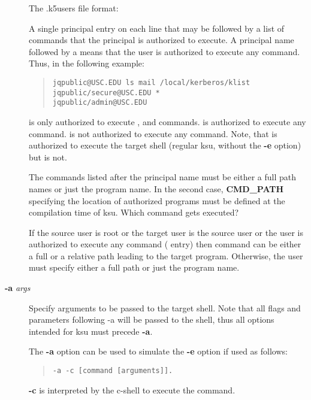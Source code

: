 \documentclass[letterpaper,10pt,english]{sphinxmanual}
\begin{document}
\begin{description}
The .k5users file format:

A single principal entry on each line that may be followed by a
list of commands that the principal is authorized to execute.  A
principal name followed by a \code{*} means that the user is
authorized to execute any command.  Thus, in the following
example:
\begin{quote}

\begin{Verbatim}[commandchars=\\\{\}]
jqpublic@USC.EDU ls mail /local/kerberos/klist
jqpublic/secure@USC.EDU *
jqpublic/admin@USC.EDU
\end{Verbatim}
\end{quote}

 is only authorized to execute ,
 and  commands.   is
authorized to execute any command.   is
not authorized to execute any command.  Note, that
 is authorized to execute the target
shell (regular ksu, without the \textbf{-e} option) but
 is not.

The commands listed after the principal name must be either a full
path names or just the program name.  In the second case,
\textbf{CMD\_PATH} specifying the location of authorized programs must
be defined at the compilation time of ksu.  Which command gets
executed?

If the source user is root or the target user is the source user
or the user is authorized to execute any command (\code{*} entry)
then command can be either a full or a relative path leading to
the target program.  Otherwise, the user must specify either a
full path or just the program name.

\item[{\textbf{-a} \emph{args}}] \leavevmode
Specify arguments to be passed to the target shell.  Note that all
flags and parameters following -a will be passed to the shell,
thus all options intended for ksu must precede \textbf{-a}.

The \textbf{-a} option can be used to simulate the \textbf{-e} option if
used as follows:
\begin{quote}

\begin{Verbatim}[commandchars=\\\{\}]
-a -c [command [arguments]].
\end{Verbatim}
\end{quote}

\textbf{-c} is interpreted by the c-shell to execute the command.

\end{description}
\end{document}
